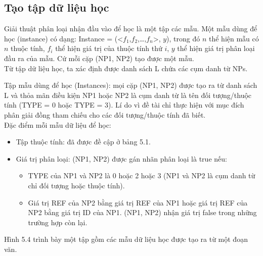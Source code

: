 \documentclass[12pt]{report}
\begin{document}
			\subsection*{Tạo tập dữ liệu học}
				\par Giải thuật phân loại nhận đầu vào để học là một tập các mẫu. Một mẫu dùng để học (instance) có dạng: Instance = (<$f_1$,$f_2$,…,$f_n$>, $y$), trong đó $n$ thể hiện mẫu có $n$ thuộc tính, $f_i$ thể hiện giá trị của thuộc tính thứ $i$, $y$ thể hiện giá trị phân loại đầu ra của mẫu. Cứ mỗi cặp (NP1, NP2) tạo được một mẫu. 
				\\Từ tập dữ liệu học, ta xác định được danh sách L chứa các cụm danh từ NPs.
				\par Tập mẫu dùng để học (Instances): mọi cặp (NP1, NP2) được tạo ra từ danh sách L và thỏa mãn điều kiện NP1 hoặc NP2 là cụm danh từ là tên đối tượng/thuộc tính (TYPE = 0 hoặc TYPE = 3). Lí do vì đề tài chỉ thực hiện với mục đích phân giải đồng tham chiếu cho các đối tượng/thuộc tính đã biết.
				\\Đặc điểm mỗi mẫu dữ liệu để học:
				\begin{itemize}
					\item{Tập thuộc tính: đã được đề cập ở bảng 5.1.}
					\item{Giá trị phân loại: (NP1, NP2) được gán nhãn phân loại là true nếu:
						\begin{itemize}
							\item{TYPE của NP1 và NP2 là 0 hoặc 2 hoặc 3 (NP1 và NP2 là cụm danh từ chỉ đối tượng hoặc thuộc tính).}
							\item{Giá trị REF của NP2 bằng giá trị REF của NP1 hoặc giá trị REF của NP2 bằng giá trị ID của NP1. (NP1, NP2) nhận giá trị false trong những trường hợp còn lại.}
						\end{itemize}}
				\end{itemize}
				\par Hình 5.4 trình bày một tập gồm các mẫu dữ liệu học được tạo ra từ một đoạn văn.		
\end{document}
